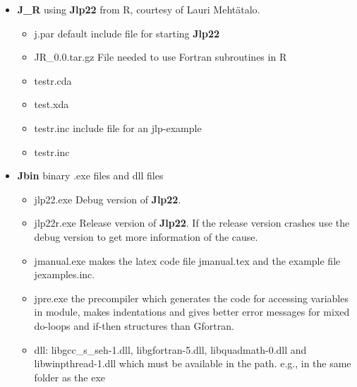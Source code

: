 \begin{itemize}


\item \textbf{J\_R}  \hspace{1cm} using \textbf{Jlp22} from R, courtesy of Lauri Meht\"atalo.

\begin{itemize}
\item j.par \hspace{1cm}default include file for starting \textbf{Jlp22}
\item JR\_0.0.tar.gz \hspace{1cm} File needed to use Fortran subroutines in R
\item testr.cda
\item test.xda
\item testr.inc \hspace{1cm} include file for an jlp-example

\item testr.inc

\end{itemize}



\item \textbf{Jbin}\hspace{1cm} binary .exe files and dll files
\begin{itemize}
\item jlp22.exe \hspace{1cm} Debug version of \textbf{Jlp22}.
\item jlp22r.exe \hspace{1cm} Release version of \textbf{Jlp22}. If the release version crashes
use the debug version to get more information of the cause.


\item jmanual.exe \hspace{1cm} makes the latex code file jmanual.tex and
the example file jexamples.inc.
\item jpre.exe \hspace{1cm} the precompiler which generates the code
for accessing variables in module, makes indentations and gives better error messages
for mixed do-loops and if-then structures than Gfortran.
\item dll:\hspace{1cm} libgcc\_s\_seh-1.dll, libgfortran-5.dll, libquadmath-0.dll and
libwinpthread-1.dll which must be available in the path. e.g., in the same folder as the exe


\end{itemize}
\end{itemize}
